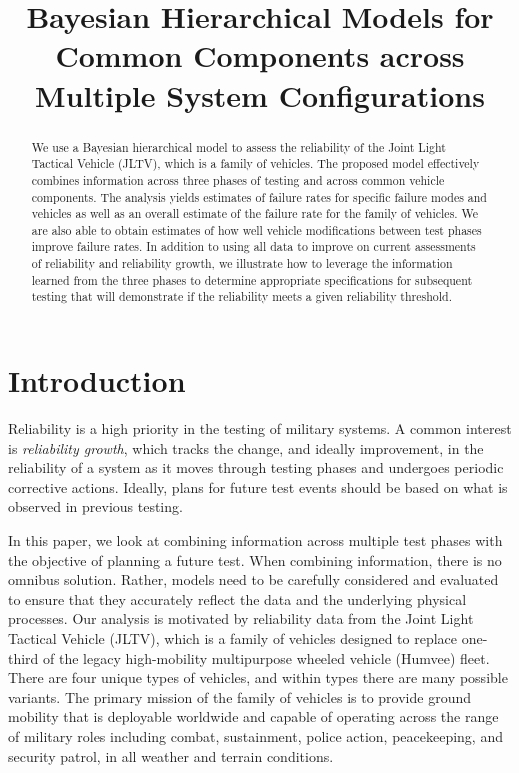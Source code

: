\documentclass[12pt]{article}
\begin{document}
\title{Bayesian Hierarchical Models for Common Components across Multiple System
Configurations}

\begin{abstract}
    We use a Bayesian hierarchical model to assess the reliability of the Joint
    Light Tactical Vehicle (JLTV), which is a family of vehicles. The proposed
    model effectively combines information across three phases of testing and
    across common vehicle components. The analysis yields estimates of failure
    rates for specific failure modes and vehicles as well as an overall estimate
    of the failure rate for the family of vehicles. We are also able to obtain
    estimates of how well vehicle modifications between test phases improve
    failure rates. In addition to using all data to improve on current
    assessments of reliability and reliability growth, we illustrate how to
    leverage the information learned from the three phases to determine
    appropriate specifications for subsequent testing that will demonstrate if
    the reliability meets a given reliability threshold.
\end{abstract}

\section{Introduction}
Reliability is a high priority in the testing of military systems. A common
interest is {\em reliability growth}, which tracks the change, and ideally
improvement, in the reliability of a system as it moves through testing phases
and undergoes periodic corrective actions. Ideally, plans for future test events
should be based on what is observed in previous testing.

In this paper, we look at combining information across multiple test phases with
the objective of planning a future test. When combining information, there is no
omnibus solution. Rather, models need to be carefully considered and evaluated
to ensure that they accurately reflect the data and the underlying physical
processes. Our analysis is motivated by reliability data from the Joint Light
Tactical Vehicle (JLTV), which is a family of vehicles designed to replace
one-third of the legacy high-mobility multipurpose wheeled vehicle (Humvee)
fleet. There are four unique types of vehicles, and within types there are many
possible variants. The primary mission of the family of vehicles is to provide
ground mobility that is deployable worldwide and capable of operating across the
range of military roles including combat, sustainment, police action,
peacekeeping, and security patrol, in all weather and terrain conditions.
\end{document}
